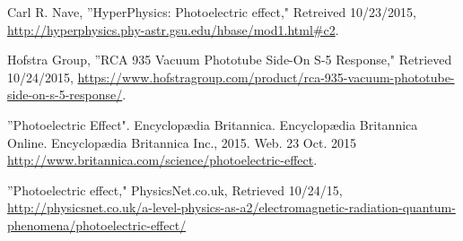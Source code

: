 \documentclass[11pt,letterpaper,onecolumn]{article}
\begin{document}
\begin{thebibliography}{9}


Carl R. Nave, ''HyperPhysics: Photoelectric effect," Retreived 10/23/2015, \url{http://hyperphysics.phy-astr.gsu.edu/hbase/mod1.html#c2}.

Hofstra Group, ''RCA 935 Vacuum Phototube Side-On S-5 Response," Retrieved 10/24/2015, \url{https://www.hofstragroup.com/product/rca-935-vacuum-phototube-side-on-s-5-response/}.

 ''Photoelectric Effect". Encyclopædia Britannica. Encyclopædia Britannica Online.
Encyclopædia Britannica Inc., 2015. Web. 23 Oct. 2015
\url{http://www.britannica.com/science/photoelectric-effect}.

''Photoelectric effect," PhysicsNet.co.uk, Retrieved 10/24/15, \url{http://physicsnet.co.uk/a-level-physics-as-a2/electromagnetic-radiation-quantum-phenomena/photoelectric-effect/}

\end{thebibliography}

\end{document}
